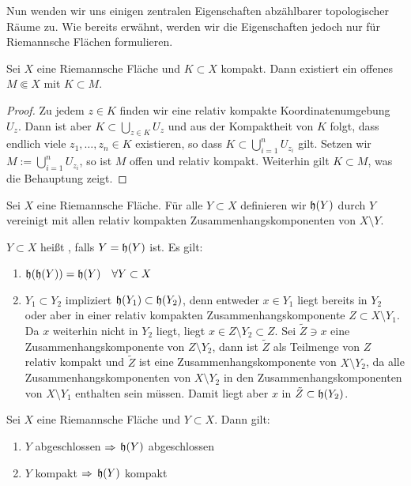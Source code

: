 Nun wenden wir uns einigen zentralen Eigenschaften abzählbarer
topologischer Räume zu. Wie bereits erwähnt, werden wir die
Eigenschaften jedoch nur für Riemannsche Flächen formulieren.

\begin{lemma}
  \label{lemma:komp-enthalten}
  Sei $X$ eine Riemannsche Fläche und $K \subset X$ kompakt. Dann
  existiert ein offenes $M \Subset X$ mit $K \subset M$.
\end{lemma}

\begin{proof}
  Zu jedem $z \in K$ finden wir eine relativ kompakte
  Koordinatenumgebung $U_z$. Dann ist aber $K \subset \bigcup_{z \in
    K}U_z$ und aus der Kompaktheit von $K$ folgt, dass endlich viele
  $z_1, \dots, z_n \in K$ existieren, so dass $K \subset
  \bigcup_{i=1}^n U_{z_i}$ gilt. Setzen wir $M := \bigcup_{i=1}^n U_{z_i}$,
  so ist $M$ offen und relativ kompakt. Weiterhin gilt $K \subset M$,
  was die Behauptung zeigt.
\end{proof}

\begin{defin}
  Sei $X$ eine Riemannsche Fläche. Für alle $Y \subset X$ definieren
  wir $\mathfrak{h}(Y)$ durch $Y$ vereinigt mit allen relativ kompakten
  Zusammenhangskomponenten von $X \setminus Y$.

  $Y \subset X$ heißt , falls $Y = \mathfrak{h}(Y)$ ist. Es gilt:
  \begin{enumerate}
  \item $\mathfrak{h}(\mathfrak{h}(Y)) = \mathfrak{h}(Y) \quad \forall Y \subset X$
  \item $Y_1 \subset Y_2$ impliziert $\mathfrak{h}(Y_1) \subset
    \mathfrak{h}(Y_2)$, denn entweder $x \in Y_1$ liegt bereits in $Y_2$
    oder aber in einer relativ kompakten Zusammenhangskomponente $Z
    \subset X \setminus Y_1$. Da $x$ weiterhin nicht in $Y_2$ liegt,
    liegt $x \in Z \setminus Y_2 \subset Z$. Sei $\tilde Z \ni x$ eine
    Zusammenhangskomponente von $Z \setminus Y_2$, dann ist $\tilde Z$
    als Teilmenge von $Z$ relativ kompakt und $\tilde Z$ ist eine
    Zusammenhangskomponente von $X \setminus Y_2$, da alle
    Zusammenhangskomponenten von $X \setminus Y_2$ in den
    Zusammenhangskomponenten von $X \setminus Y_1$ enthalten sein
    müssen. Damit liegt aber $x$ in $\tilde Z \subset \mathfrak{h}(Y_2)$.
  \end{enumerate}
\end{defin}

\begin{thm}
  Sei $X$ eine Riemannsche Fläche und $Y \subset X$. Dann gilt:
  \begin{enumerate}
  \item $Y$ abgeschlossen $\Rightarrow$ $\mathfrak{h}(Y)$ abgeschlossen
  \item $Y$ kompakt $\Rightarrow$ $\mathfrak{h}(Y)$ kompakt
  \end{enumerate}
\end{thm}

